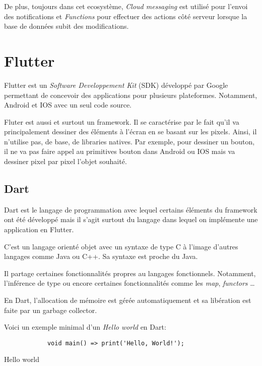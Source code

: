     De plus, toujours dans cet ecosystème, \textit{Cloud messaging} est utilisé pour l'envoi des notifications et \textit{Functions} pour 
    effectuer des actions côté serveur lorsque la base de données subit des modifications. 

    \section{Flutter}
    Flutter est un \textit{Software Developpement Kit} (SDK) développé par Google permettant de concevoir
    des applications pour plusieurs plateformes. Notamment, Android et IOS avec un seul code source.

    Fluter est aussi et surtout un framework. Il se caractérise par le fait qu'il va principalement dessiner des éléments
    à l'écran en se basant sur les pixels. Ainsi, il n'utilise pas, de base, de libraries natives. Par exemple, pour dessiner un 
    bouton, il ne va pas faire appel au primitives bouton dans Android ou IOS mais va dessiner pixel par pixel
    l'objet souhaité.

    \subsection{Dart}
    Dart est le langage de programmation avec lequel certains éléments du framework ont été développé mais il s'agit
    surtout du langage dans lequel on implémente une application en Flutter. 

    C'est un langage orienté objet avec un syntaxe de type C à l'image d'autres langages comme Java ou C++.
    Sa syntaxe est proche du Java. 
    
    Il partage certaines fonctionnalités propres au langages fonctionnels. Notamment, l'inférence de type ou encore
    certaines fonctionnalités comme les \textit{map}, \textit{functors} \dots

    En Dart, l'allocation de mémoire est gérée automatiquement et sa libération est faite par un garbage collector. 

    Voici un exemple minimal d'un \textit{Hello world} en Dart:
    \begin{listing}[!h]
        \begin{verbatim}
            void main() => print('Hello, World!');
        \end{verbatim}
        \label{code:helloWorld}
        \caption{Hello world}
    \end{listing}
    \newpage


